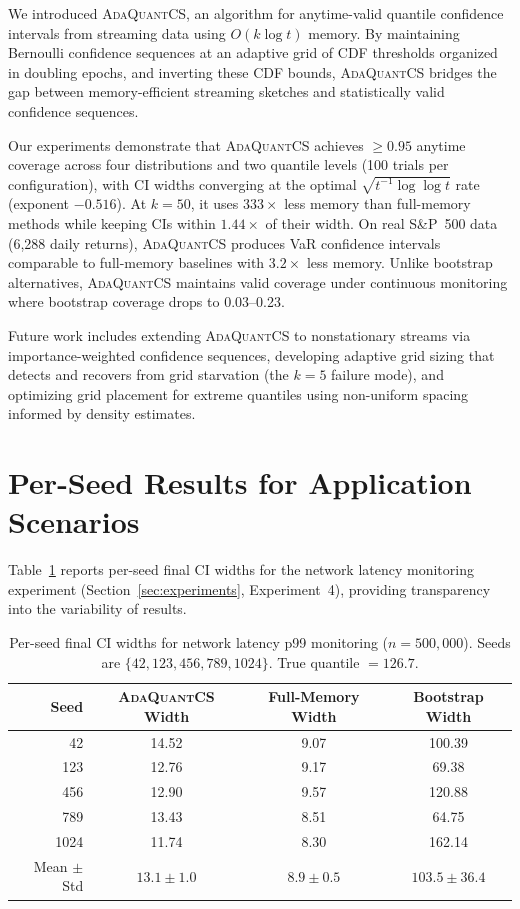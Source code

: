 \documentclass{article}
\newcommand{\ours}{\textsc{AdaQuantCS}}
\begin{document}
We introduced \ours{}, an algorithm for anytime-valid quantile confidence intervals from streaming data using $O(k \log t)$ memory. By maintaining Bernoulli confidence sequences at an adaptive grid of CDF thresholds organized in doubling epochs, and inverting these CDF bounds, \ours{} bridges the gap between memory-efficient streaming sketches and statistically valid confidence sequences.

Our experiments demonstrate that \ours{} achieves $\geq 0.95$ anytime coverage across four distributions and two quantile levels (100 trials per configuration), with CI widths converging at the optimal $\sqrt{t^{-1}\log\log t}$ rate (exponent $-0.516$). At $k = 50$, it uses $333\times$ less memory than full-memory methods while keeping CIs within $1.44\times$ of their width. On real S\&P~500 data (6{,}288 daily returns), \ours{} produces VaR confidence intervals comparable to full-memory baselines with $3.2\times$ less memory. Unlike bootstrap alternatives, \ours{} maintains valid coverage under continuous monitoring where bootstrap coverage drops to 0.03--0.23.

Future work includes extending \ours{} to nonstationary streams via importance-weighted confidence sequences, developing adaptive grid sizing that detects and recovers from grid starvation (the $k = 5$ failure mode), and optimizing grid placement for extreme quantiles using non-uniform spacing informed by density estimates.




\appendix
\section{Per-Seed Results for Application Scenarios}
\label{app:perseed}

Table~\ref{tab:realworld_seeds} reports per-seed final CI widths for the network latency monitoring experiment (Section~\ref{sec:experiments}, Experiment~4), providing transparency into the variability of results.

\begin{table}[h]
\caption{Per-seed final CI widths for network latency p99 monitoring ($n = 500{,}000$). Seeds are $\{42, 123, 456, 789, 1024\}$. True quantile $= 126.7$.}
\label{tab:realworld_seeds}
\centering
\begin{tabular}{rccc}
\toprule
Seed & \ours{} Width & Full-Memory Width & Bootstrap Width \\
\midrule
42   & 14.52 & 9.07 & 100.39 \\
123  & 12.76 & 9.17 & 69.38 \\
456  & 12.90 & 9.57 & 120.88 \\
789  & 13.43 & 8.51 & 64.75 \\
1024 & 11.74 & 8.30 & 162.14 \\
\midrule
Mean $\pm$ Std & $13.1 \pm 1.0$ & $8.9 \pm 0.5$ & $103.5 \pm 36.4$ \\
\bottomrule
\end{tabular}
\end{table}
\end{document}
